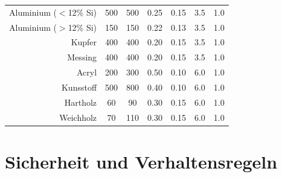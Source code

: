 \documentclass{\basedir/fablab-document}
\begin{document}
\begin{table}
\begin{tabular}{rcccccc}
	Aluminium	($<$12\% Si)			& 500	 	& 500  	& 0.25 	& 0.15	& 3.5 	& 1.0 	\\
	Aluminium	($>$12\% Si)			& 150	 	& 150  	& 0.22 	& 0.13	& 3.5 	& 1.0 	\\
	Kupfer											& 400	 	& 400  	& 0.20 	& 0.15	& 3.5 	& 1.0 	\\
	Messing											& 400	 	& 400  	& 0.20 	& 0.15	& 3.5 	& 1.0 	\\
	Acryl												& 200	 	& 300 	& 0.50 	& 0.10	& 6.0 	& 1.0 	\\
	Kunsstoff										& 500	 	& 800 	& 0.40 	& 0.10	& 6.0 	& 1.0 	\\
	Hartholz										& 60	 	& 90  	& 0.30 	& 0.15	& 6.0 	& 1.0 	\\
	Weichholz										& 70	 	& 110  	& 0.30 	& 0.15	& 6.0 	& 1.0 	\\
\end{tabular}

\end{table}

\newpage
\section{Sicherheit und Verhaltensregeln}
\end{document}
